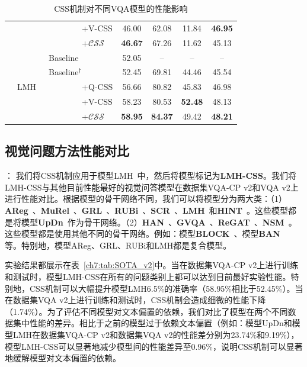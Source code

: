 \begin{table}[tbp]
\begin{center}
{\begin{tabular}{|l | l | l | c c c c|}
                & & ~~~~~~~~+V-CSS & 46.00 & 62.08 & 11.84 & \textbf{46.95} \\
                & & ~~~~~~~~+$\mathcal{CSS}$ & \textbf{46.67} & 67.26 & 11.62 & 45.13 \\
                \cline{2-7}
                & \multirow{5}{*}{LMH~\cite{clark2019don}} & Baseline & 52.05 & -- & --  & -- \\
                & & Baseline$^\dagger$ & 52.45 & 69.81 & 44.46 & 45.54 \\
                & & ~~~~~~~~+Q-CSS & 56.66 & 80.82 & 45.83 & 46.98 \\
                & & ~~~~~~~~+V-CSS & 58.23 & 80.53 & \textbf{52.48} & 48.13 \\
                & & ~~~~~~~~+$\mathcal{CSS}$ & \textbf{58.95} & \textbf{84.37} & 49.42 & \textbf{48.21} \\
                \hline
            \end{tabular}
        } %
    \end{center}
    \caption{CSS机制对不同VQA模型的性能影响}
    \label{ch7:tab:boost_models}
\end{table}

\subsection{视觉问题方法性能对比}

\textbf{}：
我们将CSS机制应用于模型LMH~\cite{clark2019don}中，然后将模型标记为\textbf{LMH-CSS}。我们将LMH-CSS与其他目前性能最好的视觉问答模型在数据集VQA-CP v2和VQA v2上进行性能对比。根据模型的骨干网络不同，我们可以将模型分为两大类：（1）\textbf{AReg}~\cite{ramakrishnan2018overcoming}、\textbf{MuRel}~\cite{cadene2019murel}、\textbf{GRL}~\cite{grand2019adversarial}、\textbf{RUBi}~\cite{cadene2019rubi}、\textbf{SCR}~\cite{wu2019self}、\textbf{LMH}~\cite{clark2019don}和\textbf{HINT}~\cite{selvaraju2019taking}。这些模型都是将模型\textbf{UpDn}~\cite{anderson2018bottom}作为骨干网络。（2）\textbf{HAN}~\cite{malinowski2018learning}、\textbf{GVQA}~\cite{agrawal2018don}、\textbf{ReGAT}~\cite{li2019relation}、\textbf{NSM}~\cite{hudson2019learning}。这些模型都是使用其他不同的骨干网络。例如：模型\textbf{BLOCK}~\cite{ben2019block}、模型\textbf{BAN}~\cite{kim2018bilinear} 等。特别地，模型AReg、GRL、RUBi和LMH都是复合模型。

实验结果都展示在表~\ref{ch7:tab:SOTA_v2}中。当在数据集VQA-CP v2上进行训练和测试时，模型LMH-CSS在所有的问题类别上都可以达到目前最好实验性能。特别地，CSS机制可以大幅提升模型LMH6.5\%的准确率（58.95\%相比于52.45\%）。当在数据集VQA v2上进行训练和测试时，CSS机制会造成细微的性能下降（1.74\%）。为了评估不同模型对文本偏置的依赖，我们对比了模型在两个不同数据集中性能的差异。相比于之前的模型过于依赖文本偏置（例如：模型UpDn和模型LMH在数据集VQA-CP v2和数据集VQA v2的性能差分别为23.74\%和9.19\%），模型LMH-CSS可以显著地减少模型间的性能差异至0.96\%，说明CSS机制可以显著地缓解模型对文本偏置的依赖。


